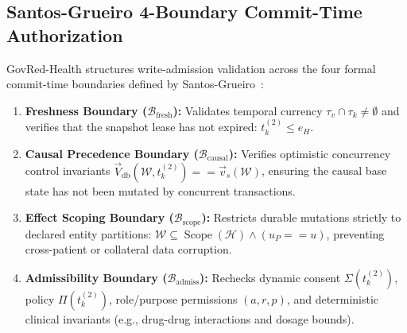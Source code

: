 \documentclass[conference,a4paper]{IEEEtran}
\begin{document}
\subsection{Santos-Grueiro 4-Boundary Commit-Time Authorization}
GovRed-Health structures write-admission validation across the four formal commit-time boundaries defined by Santos-Grueiro~\cite{temporaryauth}:
\begin{enumerate}
\item \textbf{Freshness Boundary ($\mathcal{B}_{\text{fresh}}$):} Validates temporal currency $\tau_v \cap \tau_k \neq \emptyset$ and verifies that the snapshot lease has not expired: $t_k^{(2)} \le e_H$.
\item \textbf{Causal Precedence Boundary ($\mathcal{B}_{\text{causal}}$):} Verifies optimistic concurrency control invariants $\vec{V}_{\text{db}}(\mathcal{W}, t_k^{(2)}) == \vec{v}_s(\mathcal{W})$, ensuring the causal base state has not been mutated by concurrent transactions.
\item \textbf{Effect Scoping Boundary ($\mathcal{B}_{\text{scope}}$):} Restricts durable mutations strictly to declared entity partitions: $\mathcal{W} \subseteq \operatorname{Scope}(\mathcal{H}) \land (u_P == u)$, preventing cross-patient or collateral data corruption.
\item \textbf{Admissibility Boundary ($\mathcal{B}_{\text{admiss}}$):} Rechecks dynamic consent $\Sigma(t_k^{(2)})$, policy $\Pi(t_k^{(2)})$, role/purpose permissions $(a, r, p)$, and deterministic clinical invariants (e.g., drug-drug interactions and dosage bounds).
\end{enumerate}
\end{document}
